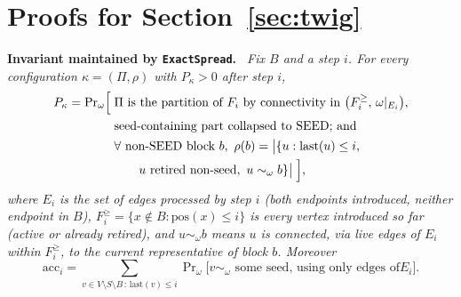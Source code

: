 \documentclass[11pt]{article}
\theoremstyle{definition}
\theoremstyle{remark}
\newenvironment{repeatlemma}[1][]{\par\medskip\noindent\textbf{#1.}\ \itshape}{\par\medskip}
\begin{document}
\appendix
\section{Proofs for Section~\ref{sec:twig}}\label{ec:twig-proofs}

\begin{repeatlemma}[Invariant maintained by \texttt{ExactSpread}]\label{ec:lem:invariant}
Fix $B$ and a step $i$. For every configuration $\kappa=(\Pi,\rho)$ with
$P_\kappa>0$ after step $i$,
\begin{align*}
P_\kappa=\Pr\nolimits_\omega\Bigl[\;&\Pi\text{ is the partition of }F_i\text{
by connectivity in }\bigl(F_i^{\ge},\,\omega|_{E_i}\bigr),\\
&\text{seed-containing part collapsed to SEED; and}\\
&\forall\text{ non-SEED block }b,\ \rho(b)=\bigl|
\{u:\mathrm{last}(u)\le i,\\
&\qquad u\text{ retired non-seed},\ u\sim_\omega b\}
\bigr|\;\Bigr],
\end{align*}
where $E_i$ is the set of edges processed by step $i$ (both endpoints
introduced, neither endpoint in $B$), $F_i^{\ge}=\{x\notin B:\mathrm{pos}(x)
\le i\}$ is every vertex introduced so far (active or already retired), and
$u\sim_\omega b$ means $u$ is connected, via live edges of $E_i$ within
$F_i^{\ge}$, to the current representative of block $b$. Moreover
$$\mathrm{acc}_i=\sum_{v\in V\setminus S\setminus B\,:\,\mathrm{last}(v)\le
i}\Pr\nolimits_\omega\bigl[v\sim_\omega\text{ some seed, using only edges of
}E_i\bigr].$$
\end{repeatlemma}
\end{document}
